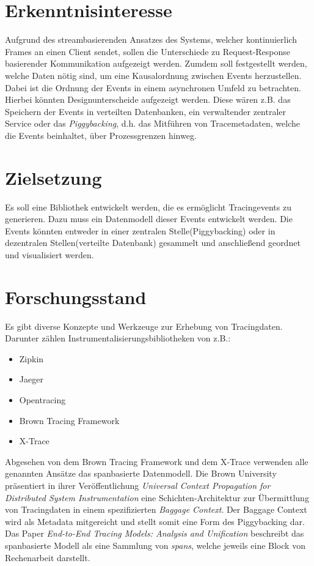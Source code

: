 \documentclass[a4paper]{article}
\begin{document}
\section{Erkenntnisinteresse}
	Aufgrund des streambasierenden Ansatzes des Systems, welcher kontinuierlich Frames an einen Client sendet, sollen die Unterschiede zu Request-Response basierender Kommunikation aufgezeigt werden. Zumdem soll festgestellt werden, welche Daten nötig sind, um eine Kausalordnung zwischen Events herzustellen. Dabei ist die Ordnung der Events in einem asynchronen Umfeld zu betrachten. Hierbei könnten Designunterscheide aufgezeigt werden. Diese wären z.B. das Speichern der Events in verteilten Datenbanken, ein verwaltender zentraler Service oder das \emph{Piggybacking}, d.h. das Mitführen von Tracemetadaten, welche die Events beinhaltet, über Prozessgrenzen hinweg.  
	
\section{Zielsetzung}
	Es soll eine Bibliothek entwickelt werden, die es ermöglicht Tracingevents zu generieren. Dazu muss ein Datenmodell dieser Events entwickelt werden. Die Events könnten entweder in einer zentralen  Stelle(Piggybacking) oder in dezentralen Stellen(verteilte Datenbank) gesammelt und anschließend geordnet und visualisiert werden. 
	
\section{Forschungsstand}
	Es gibt diverse Konzepte und Werkzeuge zur Erhebung von Tracingdaten. Darunter zählen Instrumentalisierungsbibliotheken von z.B.:
	\begin{itemize}
		\item Zipkin
		\item Jaeger
		\item Opentracing
		\item Brown Tracing Framework
		\item X-Trace
	\end{itemize}
	Abgesehen von dem Brown Tracing Framework und dem X-Trace verwenden alle genannten Ansätze das spanbasierte Datenmodell. Die Brown University präsentiert in ihrer Veröffentlichung \emph{Universal Context Propagation for Distributed System Instrumentation} eine Schichten-Architektur zur Übermittlung von Tracingdaten in einem spezifizierten \emph{Baggage Context}. Der Baggage Context wird als Metadata mitgereicht und stellt somit eine Form des Piggybacking dar. Das Paper \emph{End-to-End Tracing Models: Analysis and Unification} beschreibt das spanbasierte Modell als eine Sammlung von \emph{spans}, welche jeweils eine Block von Rechenarbeit darstellt.
\end{document}
